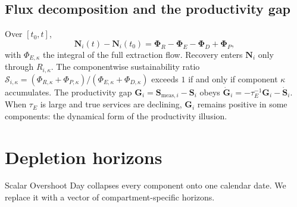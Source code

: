 \documentclass[11pt]{article}
\theoremstyle{definition}
\begin{document}
\subsection{Flux decomposition and the productivity gap}
\label{sec:productivity-gap}

Over $[t_0,t]$,
\[
\mathbf N_i(t)-\mathbf N_i(t_0)=\boldsymbol\Phi_R-\boldsymbol\Phi_E-\boldsymbol\Phi_D+\boldsymbol\Phi_P,
\]
with $\Phi_{E,\kappa}$ the integral of the full extraction flow. Recovery enters $\mathbf N_i$ only through $R_{i,\kappa}$. The componentwise sustainability ratio $\mathcal S_{i,\kappa}=(\Phi_{R,\kappa}+\Phi_{P,\kappa})/(\Phi_{E,\kappa}+\Phi_{D,\kappa})$ exceeds $1$ if and only if component $\kappa$ accumulates. The productivity gap $\mathbf G_i=\mathbf S_{\mathrm{meas},i}-\mathbf S_i$ obeys $\dot{\mathbf G}_i=-\tau_E^{-1}\mathbf G_i-\dot{\mathbf S}_i$. When $\tau_E$ is large and true services are declining, $\mathbf G_i$ remains positive in some components: the dynamical form of the productivity illusion.

\section{Depletion horizons}
\label{sec:depletion-horizon}
\label{sec:diagnostics}

Scalar Overshoot Day collapses every component onto one calendar date. We replace it with a vector of compartment-specific horizons.
\end{document}
